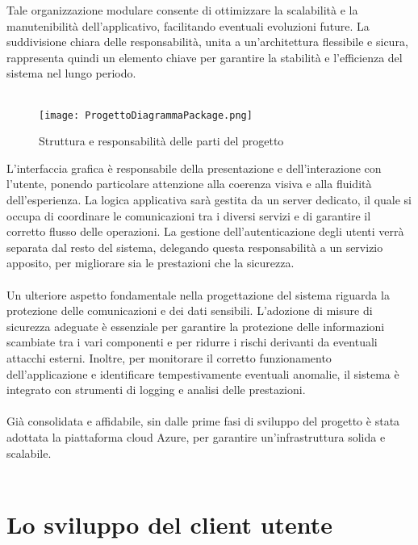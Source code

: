 Tale organizzazione modulare consente di ottimizzare la scalabilità e la manutenibilità dell’applicativo,
facilitando eventuali evoluzioni future.
La suddivisione chiara delle responsabilità, unita a un’architettura flessibile e sicura,
rappresenta quindi un elemento chiave per garantire la stabilità e l’efficienza del sistema nel lungo periodo.\\
\\
\begin{figure}[htb]
    \centering
    \texttt{[image: ProgettoDiagrammaPackage.png]}
    \caption{Struttura e responsabilità delle parti del progetto}
\end{figure}
\clearpage
L'interfaccia grafica è responsabile della presentazione e dell’interazione con l’utente,
ponendo particolare attenzione alla coerenza visiva e alla fluidità dell’esperienza.
La logica applicativa sarà gestita da un server dedicato,
il quale si occupa di coordinare le comunicazioni tra i diversi servizi
e di garantire il corretto flusso delle operazioni.
La gestione dell’autenticazione degli utenti verrà separata dal resto del sistema,
delegando questa responsabilità a un servizio apposito,
per migliorare sia le prestazioni che la sicurezza.\\
\\
Un ulteriore aspetto fondamentale nella progettazione del sistema riguarda
la protezione delle comunicazioni e dei dati sensibili.
L’adozione di misure di sicurezza adeguate è essenziale
per garantire la protezione delle informazioni scambiate tra i vari componenti e
per ridurre i rischi derivanti da eventuali attacchi esterni.
Inoltre, per monitorare il corretto funzionamento dell’applicazione e
identificare tempestivamente eventuali anomalie,
il sistema è integrato con strumenti di logging e analisi delle prestazioni.\\
\\
Già consolidata e affidabile,
sin dalle prime fasi di sviluppo del progetto è stata adottata la piattaforma cloud Azure,
per garantire un'infrastruttura solida e scalabile.\\
\\

\section{Lo sviluppo del client utente}

